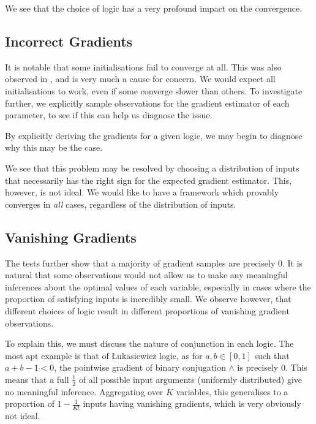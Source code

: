 
We see that the choice of logic has a very profound impact on the convergence. 

\subsection{Incorrect Gradients}

It is notable that some initialisations fail to converge at all. This was also observed in \cite{analyzefuzzy}, and is very much a cause for concern. We would expect all initialisations to work, even if some converge slower than others. To investigate further, we explicitly sample observations for the gradient estimator of each parameter, to see if this can help us diagnose the issue.



By explicitly deriving the gradients for a given logic, we may begin to diagnose why this may be the case.


We see that this problem may be resolved by choosing a distribution of inputs that necessarily has the right sign for the expected gradient estimator. This, however, is not ideal. We would like to have a framework which provably converges in \textit{all} cases, regardless of the distribution of inputs. 

\subsection{Vanishing Gradients}

The tests further show that a majority of gradient samples are precisely $0$. It is natural that some observations would not allow us to make any meaningful inferences about the optimal values of each variable, especially in cases where the proportion of satisfying inputs is incredibly small. We observe however, that different choices of logic result in different proportions of vanishing gradient observations.

To explain this, we must discuss the nature of conjunction in each logic. The most apt example is that of Łukasiewicz logic, as for $a, b \in [0,1]$ such that $a + b - 1 < 0$, the pointwise gradient of binary conjugation $\land$ is precisely $0$. This means that a full $\frac{1}{2}$ of all possible input arguments (uniformly distributed) give no meaningful inference. Aggregating over $K$ variables, this generalises to a proportion of $1 - \frac{1}{K!}$ inputs having vanishing gradients, which is very obviously not ideal.

